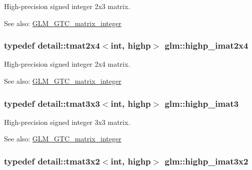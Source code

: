 High-precision signed integer 2x3 matrix. \begin{Desc}
\item[See also:]\hyperlink{group__gtc__matrix__integer}{GLM\_\-GTC\_\-matrix\_\-integer} \end{Desc}
\hypertarget{group__gtc__matrix__integer_g84aec2e744ecac589fe8d502266e8efc}{
\subsubsection[highp\_\-imat2x4]{\setlength{\rightskip}{0pt plus 5cm}typedef detail::tmat2x4$<$int, highp$>$ {\bf glm::highp\_\-imat2x4}}}
\label{group__gtc__matrix__integer_g84aec2e744ecac589fe8d502266e8efc}


High-precision signed integer 2x4 matrix. \begin{Desc}
\item[See also:]\hyperlink{group__gtc__matrix__integer}{GLM\_\-GTC\_\-matrix\_\-integer} \end{Desc}
\hypertarget{group__gtc__matrix__integer_gf12b3aa7e16a88b1fcf51be9a132048c}{
\subsubsection[highp\_\-imat3]{\setlength{\rightskip}{0pt plus 5cm}typedef detail::tmat3x3$<$int, highp$>$ {\bf glm::highp\_\-imat3}}}
\label{group__gtc__matrix__integer_gf12b3aa7e16a88b1fcf51be9a132048c}


High-precision signed integer 3x3 matrix. \begin{Desc}
\item[See also:]\hyperlink{group__gtc__matrix__integer}{GLM\_\-GTC\_\-matrix\_\-integer} \end{Desc}
\hypertarget{group__gtc__matrix__integer_g9780c1bc052a34c59dc95f4dd9e1a5c8}{
\subsubsection[highp\_\-imat3x2]{\setlength{\rightskip}{0pt plus 5cm}typedef detail::tmat3x2$<$int, highp$>$ {\bf glm::highp\_\-imat3x2}}}
\label{group__gtc__matrix__integer_g9780c1bc052a34c59dc95f4dd9e1a5c8}


